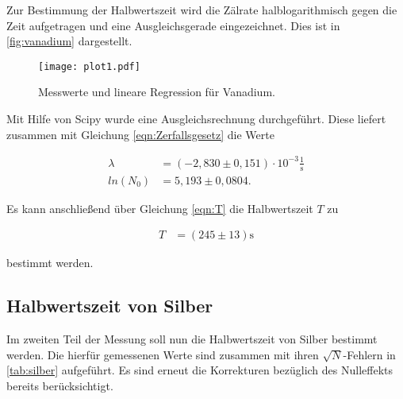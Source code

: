 Zur Bestimmung der Halbwertszeit wird die Zälrate halblogarithmisch gegen die Zeit aufgetragen und eine Ausgleichsgerade eingezeichnet.
Dies ist in \autoref{fig:vanadium} dargestellt.

\begin{figure}[H]
  \centering
  \texttt{[image: plot1.pdf]}
  \caption{Messwerte und lineare Regression für Vanadium.}
  \label{fig:vanadium}
\end{figure}

Mit Hilfe von Scipy wurde eine Ausgleichsrechnung durchgeführt. Diese liefert zusammen mit Gleichung \eqref{eqn:Zerfallsgesetz} die Werte

\begin{align*}
  \lambda &= (-2,830 \pm 0,151) \cdot 10^{-3} \frac{1}{\si{\second}} \\
  ln(N_0) &= 5,193 \pm 0,0804 .
\end{align*}

Es kann anschließend über Gleichung \eqref{eqn:T} die Halbwertszeit $T$ zu

\begin{align*}
  T &= (245 \pm 13) \si{\second}
\end{align*}

bestimmt werden.


\subsection{Halbwertszeit von Silber}
\label{sec:Silber}

Im zweiten Teil der Messung soll nun die Halbwertszeit von Silber bestimmt werden. Die hierfür gemessenen Werte sind zusammen mit ihren $\sqrt{N}$-Fehlern
in \autoref{tab:silber} aufgeführt. Es sind erneut die Korrekturen bezüglich des Nulleffekts bereits berücksichtigt.

